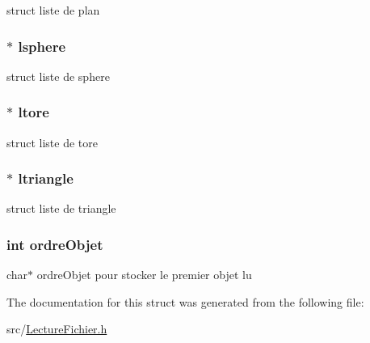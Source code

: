 \label{structobjet_c_s_g_a6c0864a0bbb65be0c48b341061498fd9}
struct liste de plan \hypertarget{structobjet_c_s_g_ad6fc54edaae24f34f8093b277a3b2d04}{
\subsubsection[{lsphere}]{$\ast$ {\bf lsphere}}}
\label{structobjet_c_s_g_ad6fc54edaae24f34f8093b277a3b2d04}
struct liste de sphere \hypertarget{structobjet_c_s_g_a47505e910fde32e049a2e94ad84b48c0}{
\subsubsection[{ltore}]{$\ast$ {\bf ltore}}}
\label{structobjet_c_s_g_a47505e910fde32e049a2e94ad84b48c0}
struct liste de tore \hypertarget{structobjet_c_s_g_aa64fa005027990999edeea5037673d45}{
\subsubsection[{ltriangle}]{$\ast$ {\bf ltriangle}}}
\label{structobjet_c_s_g_aa64fa005027990999edeea5037673d45}
struct liste de triangle \hypertarget{structobjet_c_s_g_a0f0df060d7b66c7333474d2fae92dbed}{
\subsubsection[{ordreObjet}]{\setlength{\rightskip}{0pt plus 5cm}int {\bf ordreObjet}}}
\label{structobjet_c_s_g_a0f0df060d7b66c7333474d2fae92dbed}
char$\ast$ ordreObjet pour stocker le premier objet lu 

The documentation for this struct was generated from the following file:\begin{DoxyCompactItemize}
\item 
src/\hyperlink{_lecture_fichier_8h}{LectureFichier.h}\end{DoxyCompactItemize}
